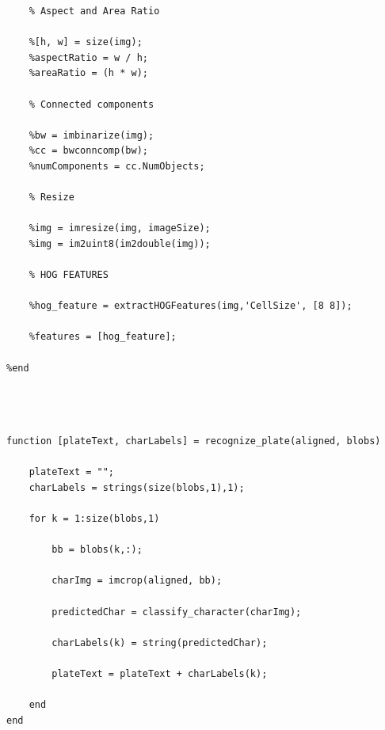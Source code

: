 \begin{verbatim}
    % Aspect and Area Ratio
    
    %[h, w] = size(img);
    %aspectRatio = w / h;
    %areaRatio = (h * w);
    
    % Connected components
    
    %bw = imbinarize(img);
    %cc = bwconncomp(bw);
    %numComponents = cc.NumObjects;
    
    % Resize
    
    %img = imresize(img, imageSize);
    %img = im2uint8(im2double(img));
    
    % HOG FEATURES
    
    %hog_feature = extractHOGFeatures(img,'CellSize', [8 8]);
    
    %features = [hog_feature];

%end
    
\end{verbatim}

\begin{verbatim}

    
function [plateText, charLabels] = recognize_plate(aligned, blobs)
    
    plateText = "";
    charLabels = strings(size(blobs,1),1);
    
    for k = 1:size(blobs,1)
    
        bb = blobs(k,:);
    
        charImg = imcrop(aligned, bb);
    
        predictedChar = classify_character(charImg);
        
        charLabels(k) = string(predictedChar);
    
        plateText = plateText + charLabels(k);
    
    end
end
    
\end{verbatim}


